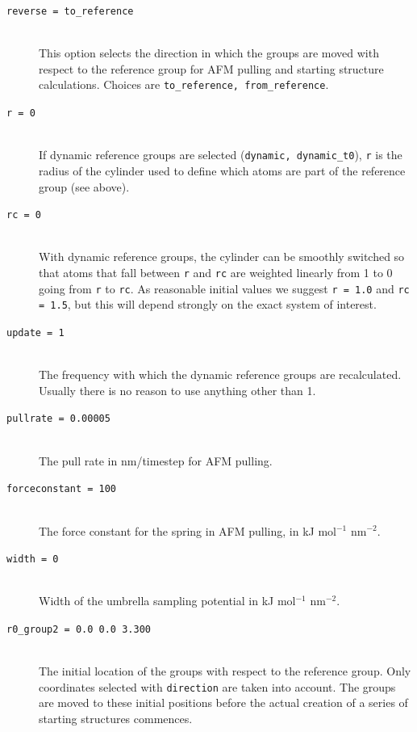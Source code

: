 \begin{description}
\item[\tt reverse                  = to\_reference]\mbox{}\\
This option selects the direction in which the groups are moved with
respect to the reference group for AFM pull\-ing and start\-ing structure
calcu\-lations. Choices are {\tt to\_reference, from\_reference}.

\item[\tt r                        = 0]\mbox{}\\
If dynamic reference groups are selected ({\tt dynamic, dynamic\_t0}),
{\tt r} is the radius of the cylinder used to define which atoms are
part of the reference group (see above).

\item[\tt rc                       = 0]\mbox{}\\
With dynamic reference groups, the cylinder can be smoothly switched
so that atoms that fall between {\tt r} and {\tt rc} are weighted
linearly from 1 to 0 going from {\tt r} to {\tt rc}. As reasonable
initial values we suggest {\tt r = 1.0} and {\tt rc = 1.5}, but this
will depend strongly on the exact system of interest.

\item[\tt update                   = 1]\mbox{}\\
The frequency with which the dynamic reference groups are
recalculated. Usually there is no reason to use anything other than 1.

\item[\tt pullrate                 = 0.00005]\mbox{}\\
The pull rate in nm/timestep for AFM pulling.

\item[\tt forceconstant            = 100]\mbox{}\\
The force constant for the spring in AFM pulling, in kJ mol$^{-1}$
nm$^{-2}$.

\item[\tt width                    = 0]\mbox{}\\
Width of the umbrella sampling potential in kJ mol$^{-1}$ nm$^{-2}$. 

\item[\tt r0\_group2                = 0.0  0.0   3.300]\mbox{}\\
The initial location of the groups with respect to the reference
group. Only coordinates selected with {\tt direction} are taken into account.
The groups are moved to these initial positions before the
actual creation of a series of starting structures commences.


\end{description}
